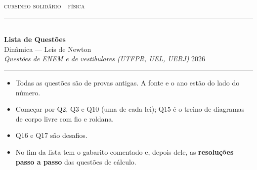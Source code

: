 \documentclass[11pt,a4paper]{article}
\begin{document}

\thispagestyle{empty}

{\scshape\color{vinho}cursinho solid\'ario \,\textperiodcentered\, f\'isica}\\[-0.5em]
{\color{vinho}\rule{\linewidth}{1.6pt}}\\[0.9em]
{\huge\bfseries Lista de Quest\~oes}\\[0.35em]
{\LARGE Din\^amica --- Leis de Newton}\\[0.7em]
{\itshape\color{grafite}Quest\~oes de ENEM e de vestibulares
(UTFPR, UEL, UERJ)}
\hfill {\color{grafite}2026}\\[-0.3em]
{\color{black!30}\rule{\linewidth}{0.5pt}}

\vspace{1.0em}

\begin{painel}

\begin{itemize}[nosep, leftmargin=1.5em]
  \item Todas as quest\~oes s\~ao de provas antigas. A fonte e o ano
        est\~ao do lado do n\'umero.
  \item Come\c{c}ar por Q2, Q3 e
        Q10 (uma de cada lei); Q15 \'e o treino de diagramas de corpo
        livre com fio e roldana.
  \item Q16 e Q17 s\~ao desafios.
  \item No fim da lista tem o gabarito comentado e, depois dele, as
        \textbf{resolu\c{c}\~oes passo a passo} das quest\~oes de
        c\'alculo.
\end{itemize}
\end{painel}

\newpage
\end{document}
